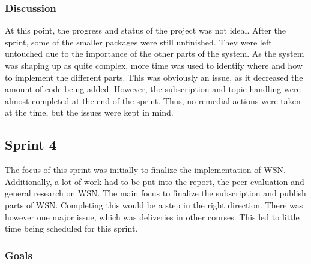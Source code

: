 \subsubsection{Discussion}
\label{subsec:project_lifecycle-development-sprint_3-discussion}

At this point, the progress and status of the project was not ideal. After the sprint, some of the smaller packages were still unfinished. They were left untouched due to the importance of the other parts of the system. As the system was shaping up as quite complex, more time was used to identify where and how to implement the different parts. This was obviously an issue, as it decreased the amount of code being added. However, the subscription and topic handling were almost completed at the end of the sprint. Thus, no remedial actions were taken at the time, but the issues were kept in mind.


\subsection{Sprint 4}
\label{subsec:project_lifecycle-development-sprint_4}

The focus of this sprint was initially to finalize the implementation of WSN. Additionally, a lot of work had to be put into the report, the peer evaluation and general research on WSN. The main focus to finalize the subscription and publish parts of WSN. Completing this would be a step in the right direction. There was however one major issue, which was deliveries in other courses. This led to little time being scheduled for this sprint.

\subsubsection{Goals}
\label{subsec:project_lifecycle-development-sprint_4-goals}

